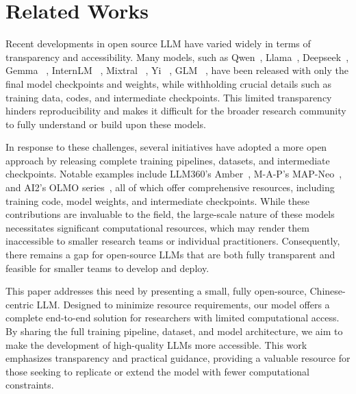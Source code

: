 \section{Related Works}
Recent developments in open source LLM have varied widely in terms of transparency and accessibility. Many models, such as Qwen~\citep{bai2023qwentechnicalreport,yang2024qwen2}, Llama~\citep{touvron2023llama2openfoundation}, Deepseek~\citep{deepseekai2024deepseek}, Gemma ~\citep{gemmateam2024gemmaopenmodelsbased}, InternLM ~\citep{cai2024internlm2}, Mixtral ~\citep{jiang2023mistral}, Yi ~\citep{ai2024yiopenfoundationmodels}, GLM ~\citep{glm2024chatglm}, have been released with only the final model checkpoints and weights, while withholding crucial details such as training data, codes, and intermediate checkpoints. This limited transparency hinders reproducibility and makes it difficult for the broader research community to fully understand or build upon these models.

In response to these challenges, several initiatives have adopted a more open approach by releasing complete training pipelines, datasets, and intermediate checkpoints. Notable examples include LLM360’s Amber~\citep{liu2023llm360, tan2024llm360}, M-A-P’s MAP-Neo~\citep{zhang2024map}, and AI2’s OLMO series~\citep{OLMo, olmo20242, muennighoff2024olmoe}, all of which offer comprehensive resources, including training code, model weights, and intermediate checkpoints. While these contributions are invaluable to the field, the large-scale nature of these models necessitates significant computational resources, which may render them inaccessible to smaller research teams or individual practitioners. Consequently, there remains a gap for open-source LLMs that are both fully transparent and feasible for smaller teams to develop and deploy.

This paper addresses this need by presenting a small, fully open-source, Chinese-centric LLM. Designed to minimize resource requirements, our model offers a complete end-to-end solution for researchers with limited computational access. By sharing the full training pipeline, dataset, and model architecture, we aim to make the development of high-quality LLMs more accessible. This work emphasizes transparency and practical guidance, providing a valuable resource for those seeking to replicate or extend the model with fewer computational constraints.